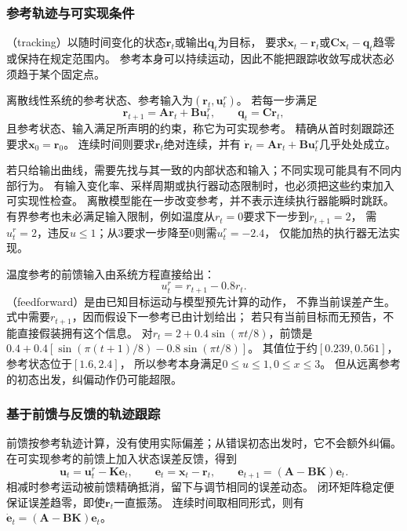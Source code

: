 \subsubsection{参考轨迹与可实现条件}
（tracking）以随时间变化的状态$\bm r_t$或输出$\bm q_t$为目标，
要求$\bm x_t-\bm r_t$或$\bm C\bm x_t-\bm q_t$趋零或保持在规定范围内。
参考本身可以持续运动，因此不能把跟踪收敛写成状态必须趋于某个固定点。
\begin{definition}[可实现参考]
\label{def:control-realizable-reference}
离散线性系统的参考状态、参考输入为$(\bm r_t,\bm u_t^r)$。
若每一步满足
\begin{equation}
  \bm r_{t+1}=\bm A\bm r_t+\bm B\bm u_t^r,
  \qquad \bm q_t=\bm C\bm r_t,
  \label{eq:control-realizable-reference}
\end{equation}
且参考状态、输入满足所声明的约束，称它为可实现参考。
精确从首时刻跟踪还要求$\bm x_0=\bm r_0$。
连续时间则要求$\bm r_t$绝对连续，并有
$\dot{\bm r}_t=\bm A\bm r_t+\bm B\bm u_t^r$几乎处处成立。
\end{definition}

若只给输出曲线，需要先找与其一致的内部状态和输入；不同实现可能具有不同内部行为。
有输入变化率、采样周期或执行器动态限制时，也必须把这些约束加入可实现性检查。
离散模型能在一步改变参考，并不表示连续执行器能瞬时跳跃。
有界参考也未必满足输入限制，例如温度从$r_t=0$要求下一步到$r_{t+1}=2$，
需$u_t^r=2$，违反$u\leq1$；从$3$要求一步降至$0$则需$u_t^r=-2.4$，
仅能加热的执行器无法实现。

温度参考的前馈输入由系统方程直接给出：
\begin{equation}
  u_t^r=r_{t+1}-0.8r_t.
  \label{eq:control-temperature-reference-input}
\end{equation}
（feedforward）是由已知目标运动与模型预先计算的动作，
不靠当前误差产生。式中需要$r_{t+1}$，因而假设下一参考已由计划给出；
若只有当前目标而无预告，不能直接假装拥有这个信息。
对$r_t=2+0.4\sin(\pi t/8)$，前馈是
$0.4+0.4[\sin(\pi(t+1)/8)-0.8\sin(\pi t/8)]$。
其值位于约$[0.239,0.561]$，参考状态位于$[1.6,2.4]$，
所以参考本身满足$0\leq u\leq1,0\leq x\leq3$。
但从远离参考的初态出发，纠偏动作仍可能超限。

\subsubsection{基于前馈与反馈的轨迹跟踪}
前馈按参考轨迹计算，没有使用实际偏差；从错误初态出发时，它不会额外纠偏。
在可实现参考的前馈上加入状态误差反馈，得到
\begin{equation}
  \bm u_t=\bm u_t^r-\bm K\bm e_t,
  \qquad \bm e_t=\bm x_t-\bm r_t,
  \qquad \bm e_{t+1}=(\bm A-\bm B\bm K)\bm e_t.
  \label{eq:control-tracking-feedback}
\end{equation}
相减时参考运动被前馈精确抵消，留下与调节相同的误差动态。
闭环矩阵稳定便保证误差趋零，即使$\bm r_t$一直振荡。
连续时间取相同形式，则有
$\dot{\bm e}_t=(\bm A-\bm B\bm K)\bm e_t$。

